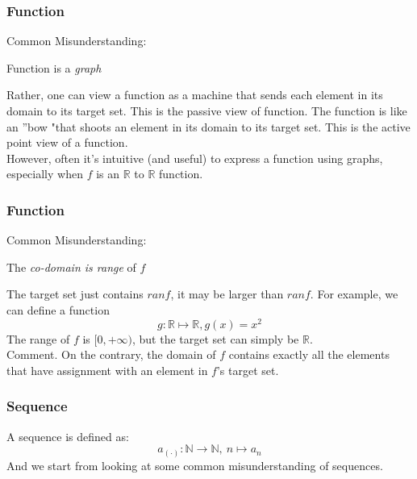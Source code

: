 \documentclass[12pt, t]{beamer}
\renewcommand{\emph}[1]{{\color{Turquoise3}\textsl{#1}}}
\begin{document}
\begin{frame}
    \frametitle{Function}
    Common Misunderstanding:\\
    \begin{center}
        Function is a \emph{graph}
    \end{center}
    \hspace{1em} Rather, one can view a function as a machine that sends each element in its domain to its target set.
    This is the passive view of function. The function is like an ''bow "that shoots an element in its domain to its
    target set. This is the active point view of a function.\\
    \vspace{1em}
    \hspace{1em} However, often it's intuitive (and useful) to express a function using graphs, especially when $f$ is an
    $\mathbb{R}$ to $\mathbb{R}$ function.
\end{frame}

\begin{frame}
    \frametitle{Function}
    Common Misunderstanding:\\
    \begin{center}
        The \emph{co-domain is range} of $f$
    \end{center}
    \hspace{1em} The target set just contains $ranf$, it may be larger than $ranf$. For example, we can define a function
    \begin{equation*}
        g: \mathbb{R}\longmapsto \mathbb{R}, g(x)=x^2
    \end{equation*}
    \hspace{1em} The range of $f$ is $[0,+\infty)$, but the target set can simply be $\mathbb{R}$.\\
    \vspace{4em}
    Comment. On the contrary, the domain of $f$ contains exactly all the elements that have assignment with an element in
    $f$'s target set.
\end{frame}

\begin{frame}
    \frametitle{Sequence}
    A sequence is defined as:
    \begin{equation*}
        a_{(\cdot)}:\mathbb{N}\rightarrow \mathbb{N}, \ n\longmapsto a_n
    \end{equation*}
    And we start from looking at some common misunderstanding of sequences.
\end{frame}
\end{document}
